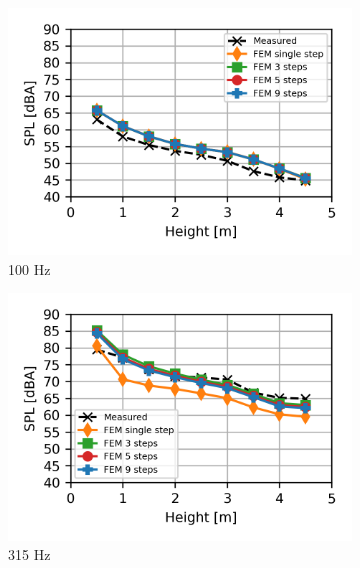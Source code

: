 \begin{figure}[H]
	\centering
	\begin{subfigure}[b]{0.49\textwidth}
		\centering
		\includegraphics{fig/chap5/freq_steps/third_octave_over_height/100_Hz.png}
		\caption{100 Hz}
	\end{subfigure}
	\begin{subfigure}[b]{0.49\textwidth}
		\centering
		\includegraphics{fig/chap5/freq_steps/third_octave_over_height/315_Hz.png}
		\caption{315 Hz}
	\end{subfigure}
	\begin{subfigure}[b]{0.49\textwidth}
		\centering

\end{subfigure}
\end{figure}
